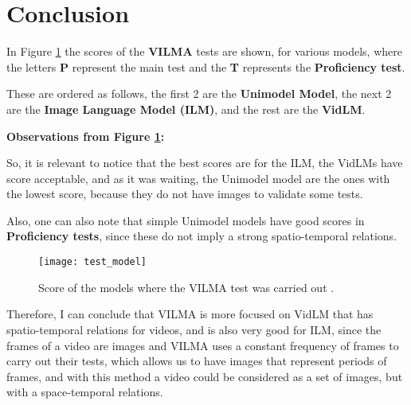 \section{Conclusion}

In Figure \ref{fig:test_model} the scores of the \textbf{VILMA} tests are shown, for various models, where the letters \textbf{P} represent the main test and the \textbf{T} represents the \textbf{Proficiency test}.

These are ordered as follows, the first 2 are the \textbf{Unimodel Model}, the next 2 are the \textbf{Image Language Model (ILM)}, and the rest are the \textbf{VidLM}.

\textbf{Observations from Figure \ref{fig:test_model}:}

So, it is relevant to notice that the best scores are for the ILM, the VidLMs have score acceptable, and as it was waiting, the Unimodel model are the ones with the lowest score, because they do not have images to validate some tests.

Also, one can also note that simple Unimodel models have good scores in \textbf{Proficiency tests}, since these do not imply a strong spatio-temporal relations.
\begin{figure}[hbt]
    \centering
    \texttt{[image: test\_model]}
    \caption{Score of the models where the VILMA test was carried out \cite[Table 2]{kesen2023ViLMA}.}
    \label{fig:test_model}
\end{figure}

Therefore, I can conclude that VILMA is more focused on VidLM that has spatio-temporal relations for videos, and is also very good for ILM, since the frames of a video are images and VILMA uses a constant frequency of frames to carry out their tests, which allows us to have images that represent periods of frames, and with this method a video could be considered as a set of images, but with a space-temporal relations.
